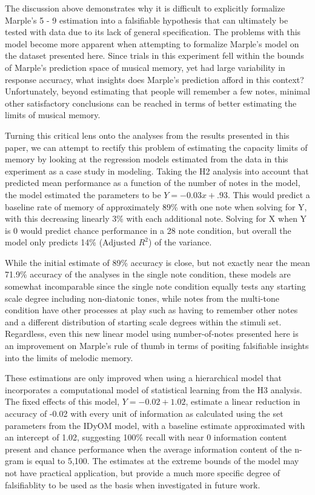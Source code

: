 \documentclass[english,man,floatsintext]{apa6}
\begin{document}
The discussion above demonstrates why it is difficult to explicitly formalize Marple's 5 - 9 estimation into a falsifiable hypothesis that can ultimately be tested with data due to its lack of general specification.
The problems with this model become more apparent when attempting to formalize Marple's model on the dataset presented here.
Since trials in this experiment fell within the bounds of Marple's prediction space of musical memory, yet had large variability in response accuracy, what insights does Marple's prediction afford in this context?
Unfortunately, beyond estimating that people will remember a few notes, minimal other satisfactory conclusions can be reached in terms of better estimating the limits of musical memory.

Turning this critical lens onto the analyses from the results presented in this paper, we can attempt to rectify this problem of estimating the capacity limits of memory by looking at the regression models estimated from the data in this experiment as a case study in modeling.
Taking the H2 analysis into account that predicted mean performance as a function of the number of notes in the model, the model estimated the parameters to be \(Y = -0.03x + .93\).
This would predict a baseline rate of memory of approximately 89\% with one note when solving for Y, with this decreasing linearly 3\% with each additional note. Solving for X when Y is 0 would predict chance performance in a 28 note condition, but overall the model only predicts 14\% (Adjusted \(R^2\)) of the variance.

While the initial estimate of 89\% accuracy is close, but not exactly near the mean 71.9\% accuracy of the analyses in the single note condition, these models are somewhat incomparable since the single note condition equally tests any starting scale degree including non-diatonic tones, while notes from the multi-tone condition have other processes at play such as having to remember other notes and a different distribution of starting scale degrees within the stimuli set.
Regardless, even this new linear model using number-of-notes presented here is an improvement on Marple's rule of thumb in terms of positing falsifiable insights into the limits of melodic memory.

These estimations are only improved when using a hierarchical model that incorporates a computational model of statistical learning from the H3 analysis.
The fixed effects of this model, \(Y = -0.02 + 1.02\), estimate a linear reduction in accuracy of -0.02 with every unit of information as calculated using the set parameters from the IDyOM model, with a baseline estimate approximated with an intercept of 1.02, suggesting 100\% recall with near 0 information content present and chance performance when the average information content of the n-gram is equal to 5,100.
The estimates at the extreme bounds of the model may not have practical application, but provide a much more specific degree of falsifiablity to be used as the basis when investigated in future work.
\end{document}
